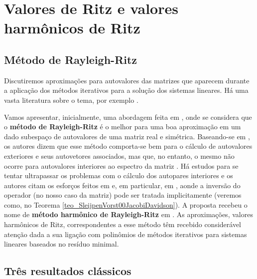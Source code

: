 \chapter{Valores de Ritz e valores harmônicos de Ritz}
\label{chap:Ritz}

\section{Método de Rayleigh-Ritz}
\label{sec:Ritz}

Discutiremos aproximações para autovalores das matrizes que aparecem durante a aplicação dos métodos iterativos para a solução dos sistemas lineares. Há uma vasta literatura sobre o tema, por exemplo \cite{Beattie1998Harmonic,GoossensRoose99Ritz,Morgan00Implicitly,PaigeParlettEtAl95Approximate,SleijpenVorst00JacobiDavidson}.

Vamos apresentar, inicialmente, uma abordagem feita em \cite{SleijpenEshof2003use}, onde se considera que o \textbf{método
de Rayleigh-Ritz}
é o melhor para uma boa aproximação em  um dado subespaço de  autovalores de uma matriz real e simétrica. Baseando-se em \cite[seção 11.4]{Parlett1998symmetric}, os autores dizem que esse método comporta-se bem para o cálculo de autovalores exteriores e seus autovetores associados, mas que, no entanto, o mesmo não ocorre para autovalores interiores ao espectro da matriz \cite{JiaStewart2001analysis,Morgan1991Computing,Scott1982Advantages}. Há estudos para se tentar ultrapassar os problemas com o cálculo dos autopares interiores e os autores citam os esforços feitos em \cite{Scott1982Advantages} e, em particular, em \cite{Morgan1991Computing}, aonde a inversão do operador (no nosso caso da matriz) pode ser tratada implicitamente (veremos como, no Teorema \ref{teo_SleijpenVorst00JacobiDavidson}).  A proposta recebeu o nome de \textbf{método harmônico de Rayleigh-Ritz} em \cite{PaigeParlettEtAl95Approximate}. As aproximações, valores harmônicos de Ritz, correspondentes a esse método têm recebido considerável atenção dada a sua ligação com polinômios de métodos iterativos para sistemas lineares baseados no resíduo minimal.

\section{Três resultados clássicos}\label{sec_trereclas}

